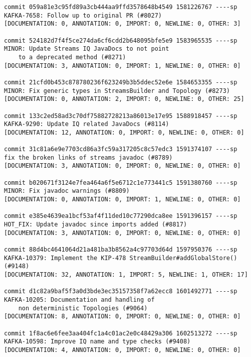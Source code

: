\begin{mdframed}
\begin{lstlisting}
commit 059a81e3c95fd89a3cb444aa9ffd3578648b4549 1581226767 ----sp
KAFKA-7658: Follow up to original PR (#8027)                                                        
[DOCUMENTATION: 0, ANNOTATION: 0, IMPORT: 0, NEWLINE: 0, OTHER: 3]

commit 524182d7f4f5ce274da6cf6cdd2b648095bfe5e9 1583965535 ----sp
MINOR: Update Streams IQ JavaDocs to not point 
    to a deprecated method (#8271)
[DOCUMENTATION: 3, ANNOTATION: 0, IMPORT: 1, NEWLINE: 0, OTHER: 0]

commit 21cfd0b453c878780236f623249b3b5ddec52e6e 1584653355 ----sp
MINOR: Fix generic types in StreamsBuilder and Topology (#8273)                                     
[DOCUMENTATION: 0, ANNOTATION: 2, IMPORT: 0, NEWLINE: 0, OTHER: 25]

commit 133c2ed58ad3c70df75882728213a86013e17e95 1588918457 ----sp
KAFKA-9290: Update IQ related JavaDocs (#8114)                                                      
[DOCUMENTATION: 12, ANNOTATION: 0, IMPORT: 0, NEWLINE: 0, OTHER: 0]

commit 31c81a6e9e7703cd86a3fc59a317205c8c57edc3 1591374107 ----sp
fix the broken links of streams javadoc (#8789)                                                     
[DOCUMENTATION: 3, ANNOTATION: 0, IMPORT: 0, NEWLINE: 0, OTHER: 0]

commit b020671f3124e7fea464a6f5e6712c1e773441c5 1591380760 ----sp
MINOR: Fix javadoc warnings (#8809)                                                                 
[DOCUMENTATION: 0, ANNOTATION: 0, IMPORT: 1, NEWLINE: 0, OTHER: 0]

commit e385e4639ea1bcf53af4f11ded10c77290dca8ee 1591396157 ----sp
HOT_FIX: Update javadoc since imports added (#8817)                                                 
[DOCUMENTATION: 3, ANNOTATION: 0, IMPORT: 0, NEWLINE: 0, OTHER: 0]

commit 88d4bc4641064d21a481ba3b8562a4c97703d64d 1597950376 ----sp
KAFKA-10379: Implement the KIP-478 StreamBuilder#addGlobalStore() (#9148)                           
[DOCUMENTATION: 32, ANNOTATION: 1, IMPORT: 5, NEWLINE: 1, OTHER: 17]

commit d1c82a9baf5f3a0d3bde3ec35157358f7a62ecc8 1601492771 ----sp
KAFKA-10205: Documentation and handling of 
    non deterministic Topologies (#9064)
[DOCUMENTATION: 8, ANNOTATION: 0, IMPORT: 0, NEWLINE: 0, OTHER: 0]

commit 1f8ac6e6fee3aa404fc1a4c01ac2e0c48429a306 1602513272 ----sp
KAFKA-10598: Improve IQ name and type checks (#9408)                                                
[DOCUMENTATION: 4, ANNOTATION: 0, IMPORT: 0, NEWLINE: 0, OTHER: 0]


\end{lstlisting}
\end{mdframed}
